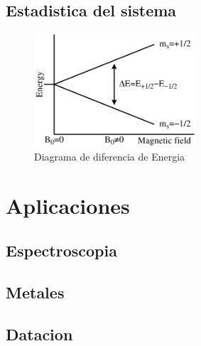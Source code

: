 \documentclass[twocolumn,amssymb,prb,aps,superscriptaddress]{revtex4}
\begin{document}
\subsection{Estadistica del sistema}
\label{mecanicaEstadistica}

    \begin{figure}[H]
        \centering
        \includegraphics[width=6.0cm]{images/EPR_splitting}
        \caption{Diagrama de diferencia de Energia}
        \label{fig:diagramaDiferenciaDeEnergia} 
    \end{figure}

\section{Aplicaciones}
\label{sec:aplicacion1}

\subsection{Espectroscopia}
\label{sec:aplicacion2}

\subsection{Metales}

\subsection{Datacion}
\end{document}

